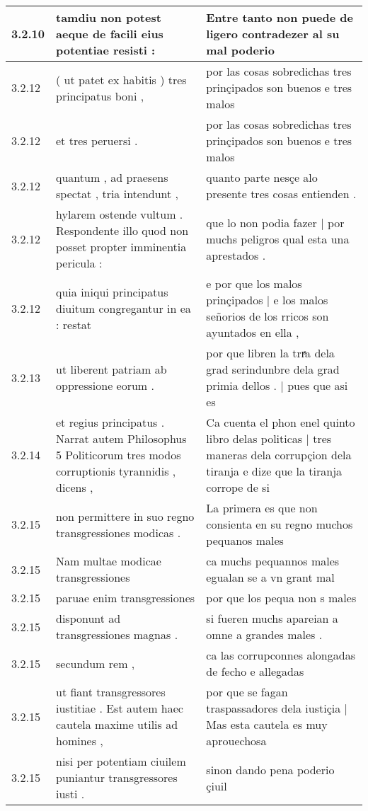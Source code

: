 \begin{tabular}{|p{1cm}|p{6.5cm}|p{6.5cm}|}
3.2.10 & tamdiu non potest aeque de facili eius potentiae resisti : & Entre tanto non puede de ligero contradezer al su mal poderio \\\hline
3.2.12 & ( ut patet ex habitis ) tres principatus boni , & por las cosas sobredichas tres prinçipados son buenos e tres malos \\\hline
3.2.12 & et tres peruersi . & por las cosas sobredichas tres prinçipados son buenos e tres malos \\\hline
3.2.12 & quantum , ad praesens spectat , tria intendunt , & quanto parte nesçe alo presente tres cosas entienden . \\\hline
3.2.12 & hylarem ostende vultum . Respondente illo quod non posset propter imminentia pericula : & que lo non podia fazer | por muchs peligros qual esta una aprestados . \\\hline
3.2.12 & quia iniqui principatus diuitum congregantur in ea : restat & e por que los malos prinçipados | e los malos señorios de los rricos son ayuntados en ella , \\\hline
3.2.13 & ut liberent patriam ab oppressione eorum . & por que libren la trrͣa dela grad serindunbre dela grad primia dellos . | pues que asi es \\\hline
3.2.14 & et regius principatus . Narrat autem Philosophus 5 Politicorum tres modos corruptionis tyrannidis , dicens , & Ca cuenta el phon enel quinto libro delas politicas | tres maneras dela corrupçion dela tiranja e dize que la tiranja corrope de si \\\hline
3.2.15 & non permittere in suo regno transgressiones modicas . & La primera es que non consienta en su regno muchos pequanos males \\\hline
3.2.15 & Nam multae modicae transgressiones & ca muchs pequannos males egualan se a vn grant mal \\\hline
3.2.15 & paruae enim transgressiones & por que los pequa non s males \\\hline
3.2.15 & disponunt ad transgressiones magnas . & si fueren muchs apareian a omne a grandes males . \\\hline
3.2.15 & secundum rem , & ca las corrupconnes alongadas de fecho e allegadas \\\hline
3.2.15 & ut fiant transgressores iustitiae . Est autem haec cautela maxime utilis ad homines , & por que se fagan traspassadores dela iustiçia | Mas esta cautela es muy aprouechosa \\\hline
3.2.15 & nisi per potentiam ciuilem puniantur transgressores iusti . & sinon dando pena poderio çiuil \\\hline

\end{tabular}
